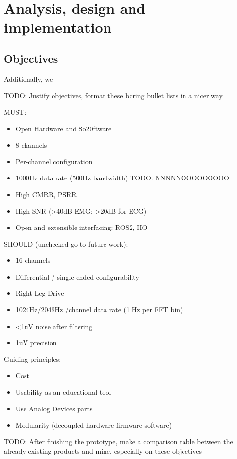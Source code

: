\documentclass{thesis}
\newcommand{\todo}[1]{{\color{red}TODO: #1}}
\begin{document}
\newpage
\section{Analysis, design and implementation}

\subsection{Objectives}

Additionally, we 

\todo{Justify objectives, format these boring bullet lists in a nicer way}

MUST:
\begin{itemize}
\item Open Hardware and So20ftware
\item 8 channels
\item Per-channel configuration
\item 1000Hz data rate (500Hz bandwidth) \todo{NNNNNOOOOOOOOO}
\item High CMRR, PSRR
\item High SNR (>40dB EMG; >20dB for ECG)
\item Open and extensible interfacing: ROS2, IIO
\end{itemize}

SHOULD (unchecked go to future work):
\begin{itemize}
\item 16 channels
\item Differential / single-ended configurability
\item Right Leg Drive
\item 1024Hz/2048Hz /channel data rate (1 Hz per FFT bin)
\item <1uV noise after filtering
\item 1uV precision
\end{itemize}

Guiding principles:
\begin{itemize}
\item Cost
\item Usability as an educational tool
\item Use Analog Devices parts
\item Modularity (decoupled hardware-firmware-software)
\end{itemize}

\todo{After finishing the prototype, make a comparison table between the already existing products and mine, especially on these objectives}
\end{document}

